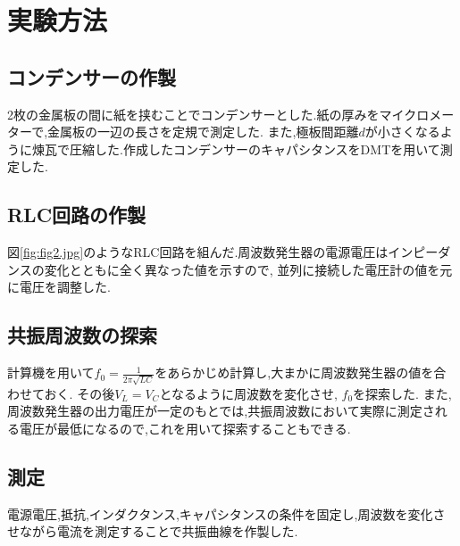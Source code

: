 \section{実験方法}
\subsection{コンデンサーの作製}
2枚の金属板の間に紙を挟むことでコンデンサーとした.紙の厚みをマイクロメーターで,金属板の一辺の長さを定規で測定した.
また,極板間距離$d$が小さくなるように煉瓦で圧縮した.作成したコンデンサーのキャパシタンスをDMTを用いて測定した.
\subsection{RLC回路の作製}
図\ref{fig:fig2.jpg}のようなRLC回路を組んだ.周波数発生器の電源電圧はインピーダンスの変化とともに全く異なった値を示すので,
並列に接続した電圧計の値を元に電圧を調整した.
\subsection{共振周波数の探索}
計算機を用いて$f_0=\frac{1}{2\pi\sqrt{LC}}$をあらかじめ計算し,大まかに周波数発生器の値を合わせておく.
その後$V_L=V_C$となるように周波数を変化させ, $f_0$を探索した.
また,周波数発生器の出力電圧が一定のもとでは,共振周波数において実際に測定される電圧が最低になるので,これを用いて探索することもできる.
\subsection{測定}
電源電圧,抵抗,インダクタンス,キャパシタンスの条件を固定し,周波数を変化させながら電流を測定することで共振曲線を作製した.